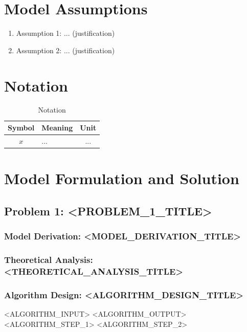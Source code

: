 \documentclass[12pt,letterpaper]{article}
\begin{document}
\section{Model Assumptions}
\begin{enumerate}
  \item Assumption 1: ... (justification)
  \item Assumption 2: ... (justification)
\end{enumerate}

\section{Notation}
\begin{table}[H]
  \centering
  \caption{Notation}\label{tab:notation}
  \begin{tabular}{clc}
    \toprule
    \textbf{Symbol} & \textbf{Meaning} & \textbf{Unit} \\
    \midrule
    $x$ & ... & ... \\
    \bottomrule
  \end{tabular}
\end{table}

\section{Model Formulation and Solution}
\subsection{Problem 1: <PROBLEM\_1\_TITLE>}
\subsubsection{Model Derivation: <MODEL\_DERIVATION\_TITLE>}
\subsubsection{Theoretical Analysis: <THEORETICAL\_ANALYSIS\_TITLE>}
\subsubsection{Algorithm Design: <ALGORITHM\_DESIGN\_TITLE>}
\begin{algorithm}[H]
\caption{<ALGORITHM\_CAPTION>}\label{alg:<ALGORITHM\_LABEL>}
\begin{algorithmic}[1]
\Require <ALGORITHM\_INPUT>
\Ensure <ALGORITHM\_OUTPUT>
\State <ALGORITHM\_STEP\_1>
\State <ALGORITHM\_STEP\_2>
\end{algorithmic}
\end{algorithm}
\end{document}
